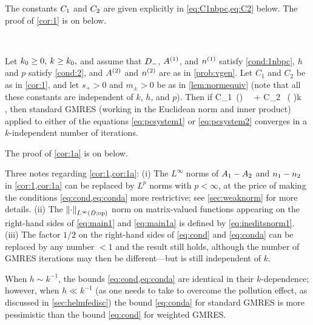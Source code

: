 The constants $C_{1}$ and $C_{2}$ are given explicitly  in \cref{eq:C1nbpc,eq:C2} below. The proof of \cref{cor:1} is on  below.

\label{cor:1a}

\

\noindent Let $k_{0} \geq 0,$ $k \geq k_{0},$ and assume that $D_{-}$, ${A}^{(1)}$, and ${n}^{(1)}$ satisfy \cref{cond:1nbpc}, $h$ and $p$ satisfy \cref{cond:2}, and ${A}^{(2)}$ and ${n}^{(2)}$ are as in \cref{prob:vgen}. Let $C_1$ and $C_2$ be as in \cref{cor:1}, and let $s_{+}>0$ and $m_{\pm}>0$ be as in \cref{lem:normequiv} (note that all these constants are independent of $k$, $h$, and $p$). Then if 
\beq\label{eq:conda}
 C_1 \,\left(\right) \, \,
\NLiDop{\Aso-\Ast} + C_2 \, \left( \right)k \, \NLiDRR{\nso-\nst},
\leq {}
\eeq
then standard GMRES (working in the Euclidean norm and inner product) applied to either of the equations \cref{eq:pcsystem1} or \cref{eq:pcsystem2}
 converges in a $k$-independent number of iterations.
 \enth

 The proof of \cref{cor:1a} is on  below.

Three notes regarding \cref{cor:1,cor:1a}: (i) The $L^\infty$ norms of $A_{1}-A_{2}$ and $n_{1}-n_{2}$ in \cref{cor:1,cor:1a} can be replaced by $L^p$ norms with $p < \infty$, at the price of making the conditions \cref{eq:cond,eq:conda} more restrictive; see \cref{sec:weaknorm} for more details. (ii) The $\NLiDop{\cdot}$ norm on matrix-valued functions appearing on the right-hand sides of \cref{eq:main1} and \cref{eq:main1a} is defined by \cref{eq:ineditsnorm1}.
(iii) The factor $1/2$ on the right-hand sides of \cref{eq:cond} and \cref{eq:conda} can be replaced by any number $<1$ and the result still holds, although the number of GMRES iterations may then be different---but is still independent of $k$.

\bre
When $h\sim  k^{-1}$, the bounds \cref{eq:cond,eq:conda} are identical in their $k$-dependence; however, when $h\ll k^{-1}$ (as one needs to take to overcome the pollution effect, as discussed in \cref{sec:helmfedisc}) the bound \cref{eq:conda} for standard GMRES is more pessimistic than the bound \cref{eq:cond} for weighted GMRES.
\ere

